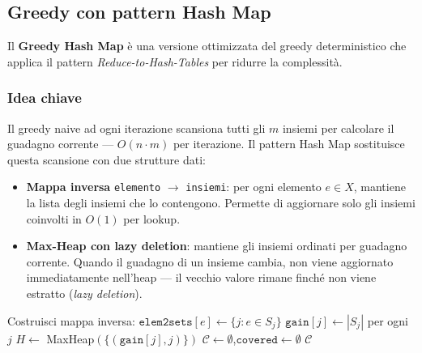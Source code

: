 \documentclass[12pt, a4paper]{article}
\begin{document}
\subsection{Greedy con pattern Hash Map}

Il \textbf{Greedy Hash Map} è una versione ottimizzata del greedy deterministico 
che applica il pattern \textit{Reduce-to-Hash-Tables} per ridurre la complessità.

\subsubsection*{Idea chiave}

Il greedy naive ad ogni iterazione scansiona tutti gli $m$ insiemi per 
calcolare il guadagno corrente — $O(n \cdot m)$ per iterazione. 
Il pattern Hash Map sostituisce questa scansione con due strutture dati:

\begin{itemize}
    \item \textbf{Mappa inversa} \texttt{elemento} $\rightarrow$ \texttt{insiemi}: 
    per ogni elemento $e \in X$, mantiene la lista degli insiemi che lo contengono. 
    Permette di aggiornare solo gli insiemi coinvolti in $O(1)$ per lookup.

    \item \textbf{Max-Heap con lazy deletion}: mantiene gli insiemi ordinati 
    per guadagno corrente. Quando il guadagno di un insieme cambia, 
    non viene aggiornato immediatamente nell'heap — il vecchio valore 
    rimane finché non viene estratto (\textit{lazy deletion}).
\end{itemize}

\begin{algorithm}[H]
\caption{Greedy Set Cover con Hash Map - pseudocodice}
Costruisci mappa inversa: $\texttt{elem2sets}[e] \leftarrow \{j : e \in S_j\}$\;
$\texttt{gain}[j] \leftarrow |S_j|$ per ogni $j$\;
$H \leftarrow$ MaxHeap$(\{(\texttt{gain}[j], j)\})$\;
$\mathcal{C} \leftarrow \emptyset$,\quad $\texttt{covered} \leftarrow \emptyset$\;
\Return $\mathcal{C}$\;
\end{algorithm}
\end{document}
